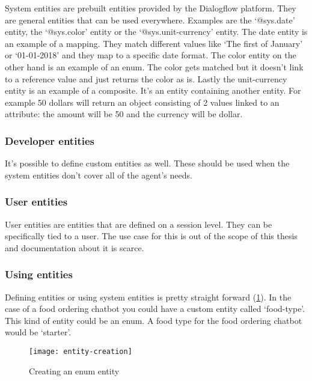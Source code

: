 System entities are prebuilt entities provided by the Dialogflow platform. They are general entities that can be used everywhere. Examples are the `@sys.date' entity, the `@sys.color' entity or the `@sys.unit-currency' entity. The date entity is an example of a mapping. They match different values like `The first of January' or `01-01-2018' and they map to a specific date format. The color entity on the other hand is an example of an enum. The color gets matched but it doesn't link to a reference value and just returns the color as is. Lastly the unit-currency entity is an example of a composite. It's an entity containing another entity. For example 50 dollars will return an object consisting of 2 values linked to an attribute: the amount will be 50 and the currency will be dollar.

\subsubsection{Developer entities}

It's possible to define custom entities as well. These should be used when the system entities don't cover all of the agent's needs.

\subsubsection{User entities}

User entities are entities that are defined on a session level. They can be specifically tied to a user. The use case for this is out of the scope of this thesis and documentation about it is scarce.

\subsubsection{Using entities}

Defining entities or using system entities is pretty straight forward (\ref{fig:entity-creation}). In the case of a food ordering chatbot you could have a custom entity called `food-type'. This kind of entity could be an enum. A food type for the food ordering chatbot would be `starter'.

\newpage

\begin{figure}[ht]
	\centering
	\texttt{[image: entity-creation]}
	\caption{Creating an enum entity}
	\label{fig:entity-creation}
\end{figure}

